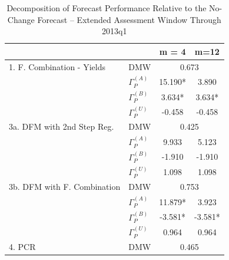 \documentclass[11pt]{article}
\renewcommand{\baselinestretch}{1.5}
\begin{document}
\clearpage
\renewcommand{\baselinestretch}{1} \normalsize 
\begin{table} 
\caption{Decomposition of Forecast Performance Relative to the No-Change Forecast --  Extended Assessment Window Through 2013q1 }                                                                                                                  
\center                                                                
\begin{tabular}{|l|l|c|c|}                                             
\hline                                                                 
&&m = 4&m=12 \\                                                        
\hline                                                                 
1. F. Combination - Yields          & DMW&\multicolumn{2}{|c|}{0.673}\\
\hline                                                                 
& $\Gamma_P^{(A)}$&15.190*&3.890\\                                     
& $\Gamma_P^{(B)}$&3.634*&3.634*\\                                     
& $\Gamma_P^{(U)}$&-0.458&-0.458\\                                     
\hline                                                                 
3a. DFM with 2nd Step Reg.          & DMW&\multicolumn{2}{|c|}{0.425}\\
\hline                                                                 
& $\Gamma_P^{(A)}$&9.933&5.123\\                                       
& $\Gamma_P^{(B)}$&-1.910&-1.910\\                                     
& $\Gamma_P^{(U)}$&1.098&1.098\\                                       
\hline                                                                 
3b. DFM with F. Combination         & DMW&\multicolumn{2}{|c|}{0.753}\\
\hline                                                                 
& $\Gamma_P^{(A)}$&11.879*&3.923\\                                     
& $\Gamma_P^{(B)}$&-3.581*&-3.581*\\                                   
& $\Gamma_P^{(U)}$&0.964&0.964\\                                       
\hline                                                                 
4. PCR                              & DMW&\multicolumn{2}{|c|}{0.465}\\

\end{tabular}
\end{table}
\end{document}
